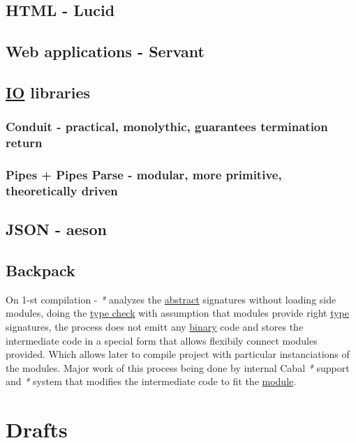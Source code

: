 \documentclass[a4paper,14pt,oneside]{book}
\begin{document}
\chapter{HTML - Lucid}
\label{sec:orga405365}

\chapter{Web applications - Servant}
\label{sec:org8e600b7}

\chapter{\hyperref[orgb38a1fb]{IO} libraries}
\label{sec:org422b995}

\section{Conduit - practical, monolythic, guarantees termination return}
\label{sec:org7dcc5c9}

\section{Pipes + Pipes Parse - modular, more primitive, theoretically driven}
\label{sec:org6d13566}

\chapter{JSON - aeson}
\label{sec:org69ce493}

\chapter{\label{org126edc0}Backpack}
\label{sec:orgc8e4ff9}
On 1-st compilation - \emph{*} analyzes the \hyperref[org939195a]{abstract} signatures without loading side modules, doing the \hyperref[org3fb4776]{type check} with assumption that modules provide right \hyperref[org35b9249]{type} signatures, the process does not emitt any \hyperref[orga442c45]{binary} code and stores the intermediate code in a special form that allows flexibily connect modules provided. Which allows later to compile project with particular instanciations of the modules. Major work of this process being done by internal Cabal \emph{*} support and \emph{*} system that modifies the intermediate code to fit the \hyperref[orgf901a5a]{module}.\\

\part{Drafts}
\label{sec:org56a9c89}
\end{document}
